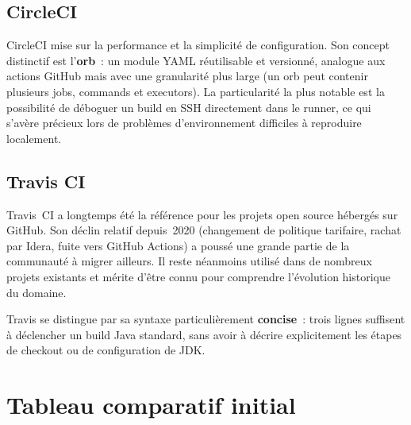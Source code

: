 \documentclass[12pt,a4paper]{report}
\begin{document}
\subsection{CircleCI}

CircleCI mise sur la performance et la simplicité de configuration. Son
concept distinctif est l'\textbf{orb}~: un module YAML réutilisable et
versionné, analogue aux actions GitHub mais avec une granularité plus large
(un orb peut contenir plusieurs jobs, commands et executors). La particularité
la plus notable est la possibilité de déboguer un build en SSH directement
dans le runner, ce qui s'avère précieux lors de problèmes d'environnement
difficiles à reproduire localement.

\subsection{Travis CI}

Travis~CI a longtemps été la référence pour les projets open source hébergés
sur GitHub. Son déclin relatif depuis~2020 (changement de politique tarifaire,
rachat par Idera, fuite vers GitHub Actions) a poussé une grande partie de la
communauté à migrer ailleurs. Il reste néanmoins utilisé dans de nombreux
projets existants et mérite d'être connu pour comprendre l'évolution
historique du domaine.

Travis se distingue par sa syntaxe particulièrement \textbf{concise}~: trois
lignes suffisent à déclencher un build Java standard, sans avoir à décrire
explicitement les étapes de checkout ou de configuration de JDK.

\section{Tableau comparatif initial}
\end{document}
